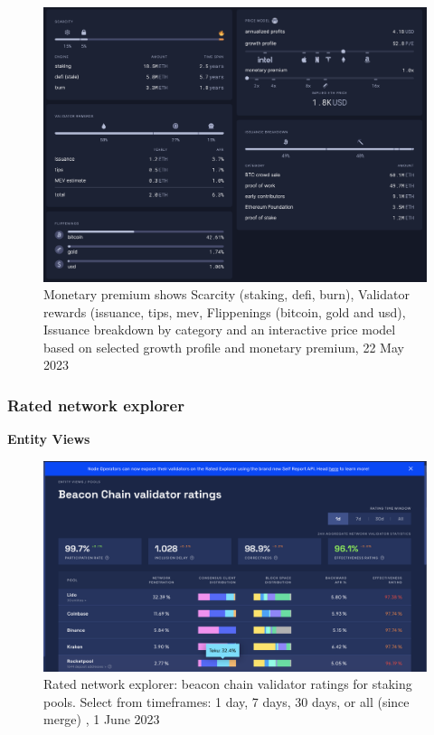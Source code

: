 \documentclass[UTF8]{article}
\begin{document}
\begin{figure}[htbp]
\begin{center}
\includegraphics[width=0.9\linewidth]{images/monetary}
\caption{Monetary premium shows Scarcity (staking, defi, burn), Validator rewards (issuance, tips, mev, Flippenings (bitcoin, gold and usd), Issuance breakdown by category and an interactive price model based on selected growth profile and monetary premium, 22 May 2023}
\label{fig:monetary}
\end{center}
\end{figure}
\clearpage


\subsubsection*{Rated network explorer}
\textbf{Entity Views} \\
\begin{figure}[htbp]
\begin{center}
\includegraphics[width=\linewidth]{images/ratedentity1}
\caption{Rated network explorer: beacon chain validator ratings for staking pools. Select from timeframes: 1 day, 7 days, 30 days, or all (since merge) , 1 June 2023}
\label{fig:ratedentity1}
\end{center}
\end{figure}
\end{document}
